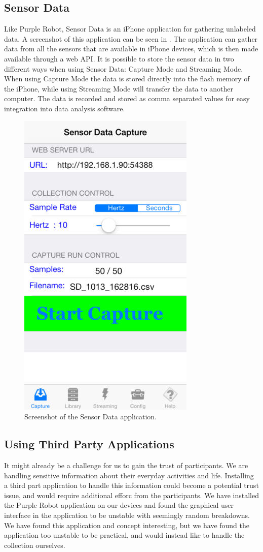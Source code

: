 \subsection{Sensor Data}
\label{sub:sensor_data}
Like Purple Robot, Sensor Data is an iPhone application for gathering unlabeled data. A screenshot of this application can be seen in . The application can gather data from all the sensors that are available in iPhone devices, which is then made available through a web API. It is possible to store the sensor data in two different ways when using Sensor Data: Capture Mode and Streaming Mode. When using Capture Mode the data is stored directly into the flash memory of the iPhone, while using Streaming Mode will transfer the data to another computer. The data is recorded and stored as comma separated values for easy integration into data analysis software.

\begin{figure}[!htbp]
	\centering
	\includegraphics[height=0.5\textwidth]{graphic/existing_solutions/sensor_data}
	\caption[]{Screenshot of the Sensor Data application\parencite{sensor_data_app_itunes}.}
	\label{fig:sensor_data_screenshot}
\end{figure}
\FloatBarrier

\subsection{Using Third Party Applications}
It might already be a challenge for us to gain the trust of participants. We are handling sensitive information about their everyday activities and life. Installing a third part application to handle this information could become a potential trust issue, and would require additional efforc from the participants. We have installed the Purple Robot application on our devices and found the graphical user interface in the application to be unstable with seemingly random breakdowns. We have found this application and concept interesting, but we have found the application too unstable to be practical, and would instead like to handle the collection ourselves. 